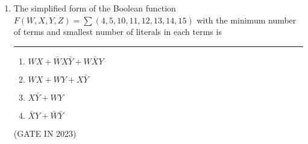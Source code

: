 \documentclass{article}
\begin{document}
\begin{enumerate}

  \item The simplified form of the Boolean function $F(W,X,Y,Z)=\sum(4,5,10,11,12,13,14,15)$ with the minimum number of terms and smallest number of literals in each terms is \rule{60pt}{1pt}
	  \begin{enumerate}
		  \item $WX+\bar WX\bar Y+W\bar XY$
		   \item $WX+WY+X\bar Y$
		     \item $X\bar Y+WY$
		      \item$\bar XY+\bar W\bar Y$

\end{enumerate}
		\hfill{(GATE IN 2023)}
\end{enumerate}
\end{document}
